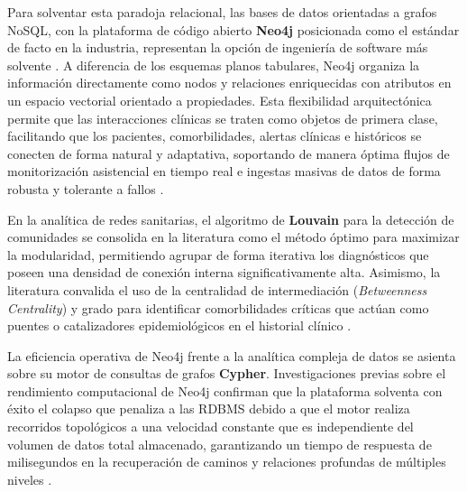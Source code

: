 \documentclass[12pt,a4paper,onecolumn,oneside]{report}
\begin{document}
Para solventar esta paradoja relacional, las bases de datos orientadas a grafos NoSQL, con la plataforma de código abierto \textbf{Neo4j} posicionada como el estándar de facto en la industria, representan la opción de ingeniería de software más solvente \cite{yousif2025real, liu2019construction}. A diferencia de los esquemas planos tabulares, Neo4j organiza la información directamente como nodos y relaciones enriquecidas con atributos en un espacio vectorial orientado a propiedades. Esta flexibilidad arquitectónica permite que las interacciones clínicas se traten como objetos de primera clase, facilitando que los pacientes, comorbilidades, alertas clínicas e históricos se conecten de forma natural y adaptativa, soportando de manera óptima flujos de monitorización asistencial en tiempo real e ingestas masivas de datos de forma robusta y tolerante a fallos \cite{yousif2025real, liu2019construction}.

En la analítica de redes sanitarias, el algoritmo de \textbf{Louvain} para la detección de comunidades se consolida en la literatura como el método óptimo para maximizar la modularidad, permitiendo agrupar de forma iterativa los diagnósticos que poseen una densidad de conexión interna significativamente alta. Asimismo, la literatura convalida el uso de la centralidad de intermediación (\textit{Betweenness Centrality}) y grado para identificar comorbilidades críticas que actúan como puentes o catalizadores epidemiológicos en el historial clínico \cite{raj2022predicting}.

La eficiencia operativa de Neo4j frente a la analítica compleja de datos se asienta sobre su motor de consultas de grafos \textbf{Cypher}. Investigaciones previas sobre el rendimiento computacional de Neo4j confirman que la plataforma solventa con éxito el colapso que penaliza a las RDBMS debido a que el motor realiza recorridos topológicos a una velocidad constante que es independiente del volumen de datos total almacenado, garantizando un tiempo de respuesta de milisegundos en la recuperación de caminos y relaciones profundas de múltiples niveles \cite{yousif2025real}.
\end{document}
